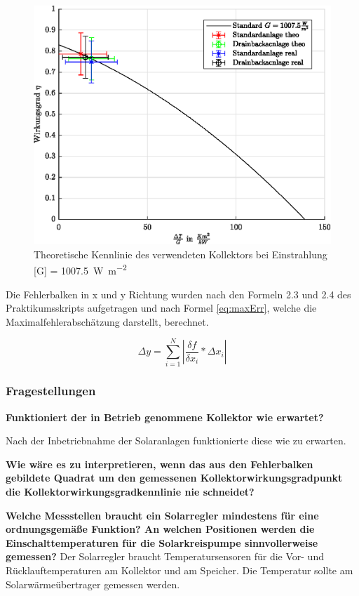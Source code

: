 \begin{figure}[H]
	\centering
	\includegraphics[height=0.3\textheight]{../DATA/KennlinieTheo.eps}
	\caption{Theoretische Kennlinie des verwendeten Kollektors bei Einstrahlung [G] = \SI{1007.5}{\watt\per\meter\squared}}
	\label{fig:KennKoll}
\end{figure}

Die Fehlerbalken in x und y Richtung wurden nach den Formeln 2.3 und 2.4 des Praktikumsskripts aufgetragen und nach Formel \eqref{eq:maxErr}, welche die Maximalfehlerabschätzung darstellt, berechnet.

\begin{equation}\label{eq:maxErr}
	\Delta y = \sum_{i=1}^{N}\left|\frac{\delta f}{\delta x_{i}}*\Delta x_{i}\right|
\end{equation}


\subsubsection{Fragestellungen}

\textbf{Funktioniert der in Betrieb genommene Kollektor wie erwartet?}

Nach der Inbetriebnahme der Solaranlagen funktionierte diese wie zu erwarten. 

\textbf{Wie wäre es zu interpretieren, wenn das aus den Fehlerbalken gebildete Quadrat um den gemessenen Kollektorwirkungsgradpunkt die Kollektorwirkungsgradkennlinie nie schneidet?}

\textbf{Welche Messstellen braucht ein Solarregler mindestens für eine ordnungsgemäße
	Funktion? An welchen Positionen werden die Einschalttemperaturen für die Solarkreispumpe
	sinnvollerweise gemessen?}
Der Solarregler braucht Temperatursensoren für die Vor- und Rücklauftemperaturen am Kollektor und am Speicher. Die Temperatur sollte am Solarwärmeübertrager gemessen werden. 

